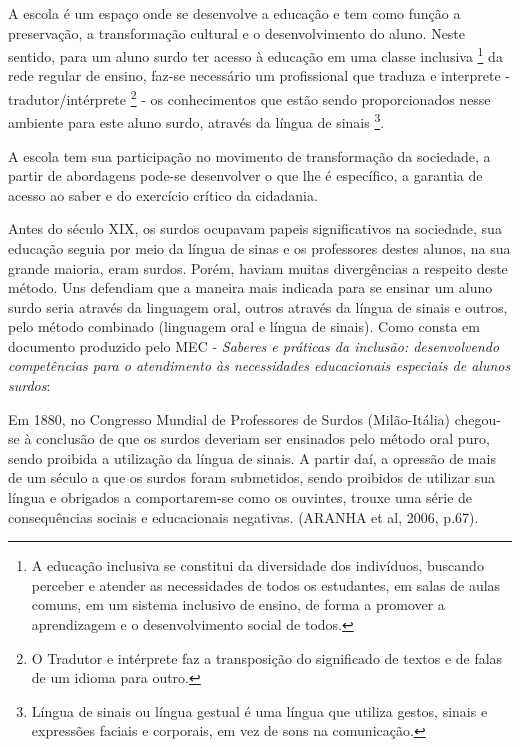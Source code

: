 \documentclass[brasil]{abnt}
\begin{document}
	A escola é um espaço onde se desenvolve a educação e tem como função a preservação, a transformação cultural e o desenvolvimento do aluno. 
	Neste sentido, para um aluno surdo ter acesso à educação em uma classe inclusiva 
	\footnote{A educação inclusiva se constitui da diversidade dos 
	indivíduos, buscando perceber e atender as necessidades de todos os 
	estudantes, em salas de aulas comuns, em um sistema inclusivo de 
	ensino, de forma a promover a aprendizagem e o desenvolvimento 
	social de todos.}
	da rede regular de ensino, faz-se necessário um profissional que 
	traduza e interprete - tradutor/intérprete
	\footnote{O Tradutor e intérprete faz a transposição do significado de textos e de falas de um idioma para outro.}
	- os conhecimentos que 
	estão sendo proporcionados nesse ambiente para este aluno surdo, através da língua de sinais
	\footnote{Língua de sinais ou língua gestual é uma língua que utiliza gestos, sinais e expressões faciais e corporais, em vez de sons na comunicação.}.
	
	A escola tem sua participação no movimento de transformação da sociedade, a partir de abordagens pode-se desenvolver o que lhe é específico, a garantia de acesso 
	ao saber e do exercício crítico da cidadania. 
	
	Antes do século XIX, os surdos ocupavam papeis significativos na sociedade, sua educação seguia por meio da língua de sinas e os professores destes alunos, na sua grande maioria, eram surdos. Porém, 
	haviam muitas divergências a respeito deste método. Uns defendiam que a maneira mais indicada para se ensinar um aluno surdo seria através da linguagem oral, outros através da língua de sinais e outros, 
	pelo método combinado (linguagem oral e língua de sinais). Como 
	consta em documento produzido pelo MEC - \textit{Saberes e práticas da 
	inclusão: desenvolvendo competências para o atendimento às 
	necessidades educacionais especiais de alunos surdos}:
		
		\begin{citacao} Em 1880, no Congresso Mundial de Professores de Surdos (Milão-Itália) 
						chegou-se à conclusão de que os surdos deveriam ser ensinados pelo método oral puro, sendo proibida a utilização da língua de sinais. A partir daí, a opressão de mais de 
						um século a que os surdos foram submetidos, sendo proibidos de utilizar sua língua e obrigados a comportarem-se como os ouvintes, trouxe uma série de consequências sociais 
						e educacionais negativas. (ARANHA et al, 2006, p.67).
		\end{citacao}
\end{document}
